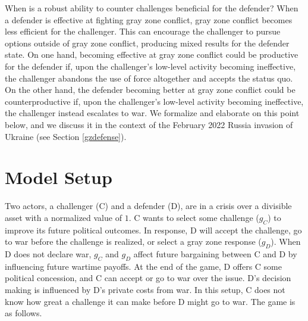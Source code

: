 \documentclass[11pt,letterpaper,pdftex,dvipsnames,table]{article}
\begin{document}
When is a robust ability to counter challenges beneficial for the defender? When a defender is effective at fighting gray zone conflict, gray zone conflict becomes less efficient for the challenger. This can encourage the challenger to pursue options outside of gray zone conflict, producing mixed results for the defender state. On one hand, becoming effective at gray zone conflict could be productive for the defender if, upon the challenger's low-level activity becoming ineffective, the challenger abandons the use of force altogether and accepts the status quo. On the other hand, the defender becoming better at gray zone conflict could be counterproductive if, upon the challenger's low-level activity becoming ineffective, the challenger instead escalates to war. We formalize and elaborate on this point below, and we discuss it in the context of the February 2022 Russia invasion of Ukraine (see Section \ref{gzdefense}).

\section{Model Setup} \label{modelsetup}

Two actors, a challenger (C) and a defender (D), are in a crisis over a divisible asset with a normalized value of $1$. C wants to select some challenge ($g_{C}$) to improve its future political outcomes. In response, D will accept the challenge, go to war before the challenge is realized, or select a gray zone response ($g_{D}$). When D does not declare war, $g_{C}$ and $g_{D}$ affect future bargaining between C and D by influencing future wartime payoffs. At the end of the game, D offers C some political concession, and C can accept or go to war over the issue. D's decision making is influenced by D's private costs from war. In this setup, C does not know how great a challenge it can make before D might go to war. The game is as follows.
\end{document}

